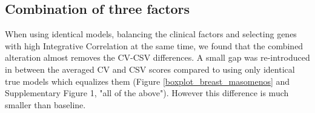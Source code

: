 \documentclass{bioinfo}
\newcommand{\fixme}[1]{\textsl{\textcolor{red}{FIXME: #1}}}
\begin{document}
   


  \subsection{Combination of three factors}


	When using identical models, balancing the clinical factors
	and selecting genes with high Integrative Correlation at the same time, 
	we found that the combined alteration almost removes the CV-CSV differences. 
	A small gap was re-introduced in between the averaged CV and CSV scores 
	compared to using only identical true models which equalizes them 
	(Figure \ref{boxplot_breast_masomenos} and Supplementary Figure 1, "all of the above"). However this difference is much smaller than	baseline. 
	
\end{document}
